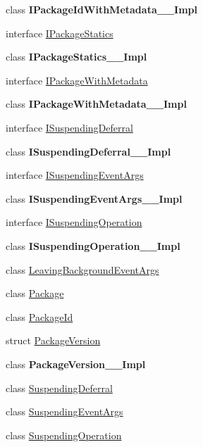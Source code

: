 \begin{DoxyCompactItemize}
class {\bfseries I\+Package\+Id\+With\+Metadata\+\_\+\+\_\+\+Impl}
\item 
interface \hyperlink{interface_windows_1_1_application_model_1_1_i_package_statics}{I\+Package\+Statics}
\item 
class {\bfseries I\+Package\+Statics\+\_\+\+\_\+\+Impl}
\item 
interface \hyperlink{interface_windows_1_1_application_model_1_1_i_package_with_metadata}{I\+Package\+With\+Metadata}
\item 
class {\bfseries I\+Package\+With\+Metadata\+\_\+\+\_\+\+Impl}
\item 
interface \hyperlink{interface_windows_1_1_application_model_1_1_i_suspending_deferral}{I\+Suspending\+Deferral}
\item 
class {\bfseries I\+Suspending\+Deferral\+\_\+\+\_\+\+Impl}
\item 
interface \hyperlink{interface_windows_1_1_application_model_1_1_i_suspending_event_args}{I\+Suspending\+Event\+Args}
\item 
class {\bfseries I\+Suspending\+Event\+Args\+\_\+\+\_\+\+Impl}
\item 
interface \hyperlink{interface_windows_1_1_application_model_1_1_i_suspending_operation}{I\+Suspending\+Operation}
\item 
class {\bfseries I\+Suspending\+Operation\+\_\+\+\_\+\+Impl}
\item 
class \hyperlink{class_windows_1_1_application_model_1_1_leaving_background_event_args}{Leaving\+Background\+Event\+Args}
\item 
class \hyperlink{class_windows_1_1_application_model_1_1_package}{Package}
\item 
class \hyperlink{class_windows_1_1_application_model_1_1_package_id}{Package\+Id}
\item 
struct \hyperlink{struct_windows_1_1_application_model_1_1_package_version}{Package\+Version}
\item 
class {\bfseries Package\+Version\+\_\+\+\_\+\+Impl}
\item 
class \hyperlink{class_windows_1_1_application_model_1_1_suspending_deferral}{Suspending\+Deferral}
\item 
class \hyperlink{class_windows_1_1_application_model_1_1_suspending_event_args}{Suspending\+Event\+Args}
\item 
class \hyperlink{class_windows_1_1_application_model_1_1_suspending_operation}{Suspending\+Operation}
\end{DoxyCompactItemize}
